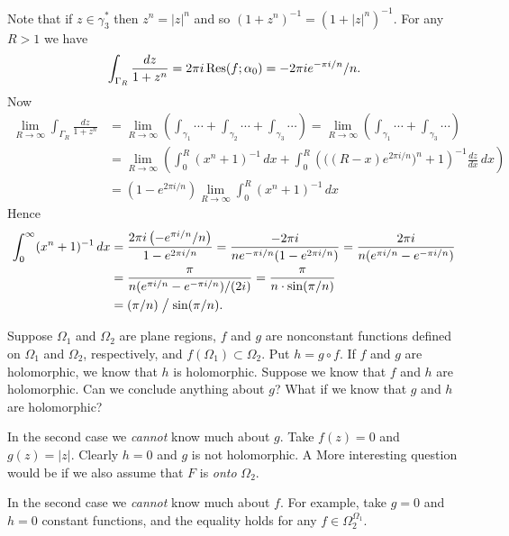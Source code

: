\begin{enumerate}
Note that if \(z\in \gamma_3^*\) then 
\(z^n = |z|^n\) and so \((1+z^n)^{-1} = (1+|z|^n)^{-1}\).
For any \(R>1\) we have
\begin{equation*} 
\int_{\Gamma_R} \frac{dz}{1+z^n} = 2\pi i \mathop{\rm Res}\nolimits(f;\alpha_0) 
= - 2\pi i e^{-\pi i/n}/n.
\end{equation*}
Now
\begin{align*}
\lim_{R\to\infty} \int_{\Gamma_R} \frac{dz}{1+z^n}
&= \lim_{R\to\infty} 
   \left( \int_{\gamma_1}\cdots +\int_{\gamma_2}\cdots +\int_{\gamma_3}\cdots \right)
 = \lim_{R\to\infty} \left( \int_{\gamma_1}\cdots +\int_{\gamma_3}\cdots \right) \\
&= \lim_{R\to\infty} \left( 
        \int_0^R (x^n+1)^{-1}\,dx +
        \int_0^R \left(\bigl((R-x)e^{2\pi i /n}\bigr)^n+1\right)^{-1}
                 \frac{dz}{dx}
                 \,dx\right) \\
&= (1 - e^{2\pi i /n}) \lim_{R\to\infty}  \int_0^R (x^n+1)^{-1}\,dx
\end{align*}
Hence 
\begin{align*}
 \int_0^\infty (x^n+1)^{-1}\,dx 
 &= \frac{2\pi i \left(-e^{\pi i/n}/n\right)}{1 - e^{2\pi i /n}}
  = \frac{-2\pi i }{ne^{-\pi i/n}(1 - e^{2\pi i /n})}
  = \frac{2\pi i }{n(e^{\pi i/n} - e^{-\pi i /n})} \\
 &= \frac{\pi}{n(e^{\pi i/n} - e^{-\pi i /n})/(2i)}
  = \frac{\pi}{n\cdot\sin(\pi/n)} \\
 &= (\pi/n)\bigm/\sin(\pi/n).
\end{align*}


\begin{excopy}
Suppose \(\Omega_1\) and \(\Omega_2\) are plane regions, $f$ and $g$ are
nonconstant functions defined on
\(\Omega_1\) and \(\Omega_2\), respectively,
and \(f(\Omega_1) \subset \Omega_2\).
Put \(h = g\circ f\).
If $f$ and $g$ are holomorphic, we know that $h$ is  holomorphic.
Suppose we know that $f$ and $h$ are holomorphic.
Can we conclude anything about $g$?
What if we know that $g$ and $h$ are holomorphic?
\end{excopy}

In the second case we \emph{cannot} know much about $g$.
Take \(f(z)=0\) and \(g(z)=|z|\).
Clearly \(h=0\) and $g$ is not holomorphic.
A More interesting question would be if we also assume that 
$F$ is \emph{onto} \(\Omega_2\).


In the second case we \emph{cannot} know much about $f$.
For example, take \(g=0\) and \(h=0\) constant functions, 
and the equality holds for any \(f \in \Omega_2^{\Omega_1}\).


\end{enumerate}
